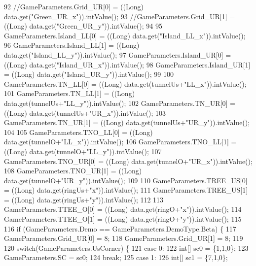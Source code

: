 \begin{DoxyCode}
92       \textcolor{comment}{//GameParameters.Grid\_UR[0] = ((Long) data.get("Green\_UR\_x")).intValue();}
93       \textcolor{comment}{//GameParameters.Grid\_UR[1] = ((Long) data.get("Green\_UR\_y")).intValue();}
94 
95       GameParameters.Island\_LL[0] = ((Long) data.get(\textcolor{stringliteral}{"Island\_LL\_x"})).intValue();
96       GameParameters.Island\_LL[1] = ((Long) data.get(\textcolor{stringliteral}{"Island\_LL\_y"})).intValue();
97       GameParameters.Island\_UR[0] = ((Long) data.get(\textcolor{stringliteral}{"Island\_UR\_x"})).intValue();
98       GameParameters.Island\_UR[1] = ((Long) data.get(\textcolor{stringliteral}{"Island\_UR\_y"})).intValue();
99 
100       GameParameters.TN\_LL[0] = ((Long) data.get(tunnelUs+\textcolor{stringliteral}{"LL\_x"})).intValue();
101       GameParameters.TN\_LL[1] = ((Long) data.get(tunnelUs+\textcolor{stringliteral}{"LL\_y"})).intValue();
102       GameParameters.TN\_UR[0] = ((Long) data.get(tunnelUs+\textcolor{stringliteral}{"UR\_x"})).intValue();
103       GameParameters.TN\_UR[1] = ((Long) data.get(tunnelUs+\textcolor{stringliteral}{"UR\_y"})).intValue();
104 
105       GameParameters.TNO\_LL[0] = ((Long) data.get(tunnelO+\textcolor{stringliteral}{"LL\_x"})).intValue();
106       GameParameters.TNO\_LL[1] = ((Long) data.get(tunnelO+\textcolor{stringliteral}{"LL\_y"})).intValue();
107       GameParameters.TNO\_UR[0] = ((Long) data.get(tunnelO+\textcolor{stringliteral}{"UR\_x"})).intValue();
108       GameParameters.TNO\_UR[1] = ((Long) data.get(tunnelO+\textcolor{stringliteral}{"UR\_y"})).intValue();
109 
110       GameParameters.TREE\_US[0] = ((Long) data.get(ringUs+\textcolor{stringliteral}{"x"})).intValue();
111       GameParameters.TREE\_US[1] = ((Long) data.get(ringUs+\textcolor{stringliteral}{"y"})).intValue();
112 
113       GameParameters.TTEE\_O[0] = ((Long) data.get(ringO+\textcolor{stringliteral}{"x"})).intValue();
114       GameParameters.TTEE\_O[1] = ((Long) data.get(ringO+\textcolor{stringliteral}{"y"})).intValue();
115 
116       \textcolor{keywordflow}{if} (GameParameters.Demo == GameParameters.DemoType.Beta) \{
117         GameParameters.Grid\_UR[0] = 8;
118         GameParameters.Grid\_UR[1] = 8;
119         
120         \textcolor{keywordflow}{switch}(GameParameters.UsCorner) \{
121           \textcolor{keywordflow}{case} 0:
122             \textcolor{keywordtype}{int}[] sc0 = \{1,1,0\};
123             GameParameters.SC = sc0;
124             \textcolor{keywordflow}{break};
125           \textcolor{keywordflow}{case} 1:
126             \textcolor{keywordtype}{int}[] sc1 = \{7,1,0\};

\end{DoxyCode}
